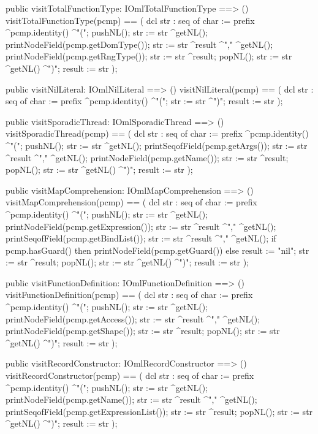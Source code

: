 \begin{vdm_al}
  public visitTotalFunctionType: IOmlTotalFunctionType ==> ()
  visitTotalFunctionType(pcmp) ==
    ( dcl str : seq of char := prefix ^pcmp.identity() ^"(";
      pushNL();
      str := str ^getNL();
      printNodeField(pcmp.getDomType());
      str := str ^result ^"," ^getNL();
      printNodeField(pcmp.getRngType());
      str := str ^result;
      popNL();
      str := str ^getNL() ^")";
      result := str );

  public visitNilLiteral: IOmlNilLiteral ==> ()
  visitNilLiteral(pcmp) ==
    ( dcl str : seq of char := prefix ^pcmp.identity() ^"(";
      str := str ^")";
      result := str );

  public visitSporadicThread: IOmlSporadicThread ==> ()
  visitSporadicThread(pcmp) ==
    ( dcl str : seq of char := prefix ^pcmp.identity() ^"(";
      pushNL();
      str := str ^getNL();
      printSeqofField(pcmp.getArgs());
      str := str ^result ^"," ^getNL();
      printNodeField(pcmp.getName());
      str := str ^result;
      popNL();
      str := str ^getNL() ^")";
      result := str );

  public visitMapComprehension: IOmlMapComprehension ==> ()
  visitMapComprehension(pcmp) ==
    ( dcl str : seq of char := prefix ^pcmp.identity() ^"(";
      pushNL();
      str := str ^getNL();
      printNodeField(pcmp.getExpression());
      str := str ^result ^"," ^getNL();
      printSeqofField(pcmp.getBindList());
      str := str ^result ^"," ^getNL();
      if pcmp.hasGuard()
      then printNodeField(pcmp.getGuard())
      else result := "nil";
      str := str ^result;
      popNL();
      str := str ^getNL() ^")";
      result := str );

  public visitFunctionDefinition: IOmlFunctionDefinition ==> ()
  visitFunctionDefinition(pcmp) ==
    ( dcl str : seq of char := prefix ^pcmp.identity() ^"(";
      pushNL();
      str := str ^getNL();
      printNodeField(pcmp.getAccess());
      str := str ^result ^"," ^getNL();
      printNodeField(pcmp.getShape());
      str := str ^result;
      popNL();
      str := str ^getNL() ^")";
      result := str );

  public visitRecordConstructor: IOmlRecordConstructor ==> ()
  visitRecordConstructor(pcmp) ==
    ( dcl str : seq of char := prefix ^pcmp.identity() ^"(";
      pushNL();
      str := str ^getNL();
      printNodeField(pcmp.getName());
      str := str ^result ^"," ^getNL();
      printSeqofField(pcmp.getExpressionList());
      str := str ^result;
      popNL();
      str := str ^getNL() ^")";
      result := str );


\end{vdm_al}

